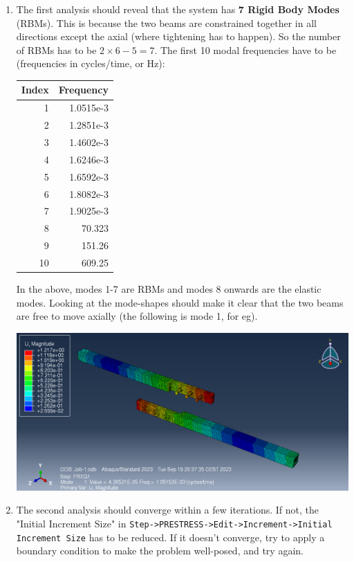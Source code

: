 \documentclass[11pt]{article}
\begin{document}
\begin{enumerate}
\item The first analysis should reveal that the system has \textbf{7 Rigid Body Modes} (RBMs).
This is because the two beams are  constrained together in all directions except the axial (where tightening has to happen).
So the number of RBMs has to be \(2\times 6 - 5 = 7\).
The first 10 modal frequencies have to be (frequencies in cycles/time, or Hz):
\begin{center}
\begin{tabular}{rr}
Index & Frequency\\[0pt]
\hline
1 & 1.0515e-3\\[0pt]
2 & 1.2851e-3\\[0pt]
3 & 1.4602e-3\\[0pt]
4 & 1.6246e-3\\[0pt]
5 & 1.6592e-3\\[0pt]
6 & 1.8082e-3\\[0pt]
7 & 1.9025e-3\\[0pt]
8 & 70.323\\[0pt]
9 & 151.26\\[0pt]
10 & 609.25\\[0pt]
\end{tabular}
\end{center}
In the above, modes 1-7 are RBMs and modes 8 onwards are the elastic modes.
Looking at the mode-shapes should make it clear that the two beams are free to move axially (the following is mode 1, for eg).
\begin{center}
\includegraphics[width=.9\linewidth]{./figs/res1.png}
\end{center}
\item The second analysis should converge within a few iterations.
If not, the "Initial Increment Size" in \texttt{Step->PRESTRESS->Edit->Increment->Initial Increment Size} has to be reduced.
If it doesn't converge, try to apply a boundary condition to make the problem well-posed, and try again.

\end{enumerate}
\end{document}
